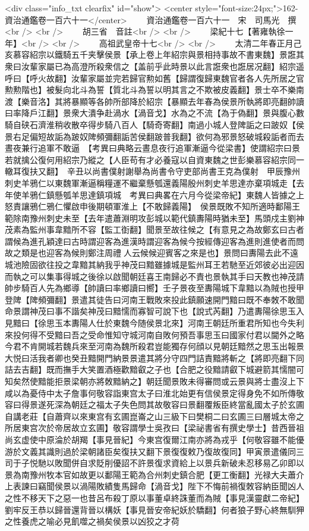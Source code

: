 <div class="info_txt clearfix" id="show">
<center style="font-size:24px;">162-資治通鑑卷一百六十一</center>
  　　資治通鑑卷一百六十一　宋　司馬光　撰<br />
<br />
　　胡三省　音註<br />
<br />
　　梁紀十七【著雍執徐一年】<br />
<br />
　　高祖武皇帝十七<br />
<br />
　　太清二年春正月己亥慕容紹宗以鐵騎五千夹擊侯景【承上卷上年紹宗與景相持事故不書東魏】景誑其衆曰汝輩家屬已為高澄所殺衆信之【盖前乎此時景以此言誑衆也誑居况翻】紹宗遥呼曰【呼火故翻】汝輩家屬並完若歸官勲如舊【歸謂復歸東魏官者各人先所居之官勲勲階也】被髮向北斗為誓【質北斗為誓以明其言之不欺被皮義翻】景士卒不樂南渡【樂音洛】其將暴顯等各帥所部降於紹宗【暴顯去年春為侯景所執將即亮翻帥讀曰率降戶江翻】景衆大潰争赴渦水【渦音戈】水為之不流【為于偽翻】景與腹心數騎自硖石濟淮稍收散卒得步騎八百人【騎奇寄翻】南過小城人登陴詬之曰跛奴【侯景右足偏短故詬為跛奴陴頻彌翻詬苦侯翻跛普我翻】欲何為邪景怒破城殺詬者而去晝夜兼行追軍不敢逼　【考異曰典略云晝息夜行追軍漸逼今從梁書】使謂紹宗曰景若就擒公復何用紹宗乃縱之【人臣苟有才必養寇以自資東魏之世彭樂慕容紹宗同一轍耳復扶又翻】　辛丑以尚書僕射謝舉為尚書令守吏部尚書王克為僕射　甲辰豫州刺史羊鴉仁以東魏軍漸逼稱糧運不繼棄懸瓠還義陽殷州刺史羊思達亦棄項城走【去年使羊鴉仁鎮懸瓠羊思達鎮項城　考異曰典畧在六月今從梁帝紀】東魏人皆據之上怒責讓鴉仁鴉仁懼啟申後期頓軍淮上【不敢歸義陽】　侯景既敗不知所適時鄱陽王範除南豫州刺史未至【去年遣蕭淵明攻彭城以範代鎮夀陽時猶未至】馬頭戍主劉神茂素為監州事韋黯所不容【監工衘翻】聞景至故往候之【有意見之為故鄭玄曰古者謂候為進孔穎達曰古時謂迎客為進漢時謂迎客為候今按經傳迎客為進則進使者而問故之類是也迎客為候則鄭注周禮人云候候迎賓客之來是也】景問曰夀陽去此不遠城池險固欲往投之韋黯其納我乎神茂曰黯雖據城是監州耳王若馳至近郊彼必出迎因而執之可以集事得城之後徐以啟聞朝廷喜王南歸必不責也景執其手曰天教也神茂請帥步騎百人先為鄉導【帥讀曰率鄉讀曰嚮】壬子景夜至夀陽城下韋黯以為賊也授甲登陴【陴頻彌翻】景遣其徒告曰河南王戰敗來投此鎮願速開門黯曰既不奉敇不敢聞命景謂神茂曰事不諧矣神茂曰黯懦而寡智可說下也【說式芮翻】乃遣夀陽徐思玉入見黯曰【徐思玉本夀陽人仕於東魏今随侯景北來】河南王朝廷所重君所知也今失利來投何得不受黯曰吾之受命惟知守城河南自敗何預吾事思玉曰國家付君以閫外之略今君不肯開城若魏兵來至河南為魏所殺君豈能獨存何顔以見朝廷黯然之思玉出報景大悦曰活我者卿也癸丑黯開門納景景遣其將分守四門詰責黯將斬之【將即亮翻下同詰去吉翻】既而撫手大笑置酒極歡黯叡之子也【合肥之役黯請叡下城避箭其懦闇可知矣然使黯能拒景梁朝亦將敇黯納之】朝廷聞景敗未得審問或云景與將士盡沒上下咸以為憂侍中太子詹事何敬容詣東宫太子曰淮北始更有信侯景定得身免不如所傳敬容曰得景遂死深為朝廷之福太子失色問其故敬容曰景翻覆叛臣終當亂國太子於玄圃自講老莊【自蕭齊以來東宫有玄圃崑崙之山三級下曰樊桐二曰玄圃三曰層城太帝之所居東宫次於帝居故立玄圃】敬容謂學士吳孜曰【梁祕書省有撰史學士】昔西晉祖尚玄虚使中原淪於胡羯【事見晉紀】今東宫復爾江南亦將為戎乎【何敬容雖不能優游於文義其識則過於梁朝諸臣矣復扶又翻下景復復敕乃復故復同】甲寅景遣儀同三司于子悦馳以敗聞併自求貶削優詔不許景復求資給上以景兵新破未忍移易乙卯即以景為南豫州牧本官如故更以鄱陽王範為合州刺史鎮合肥【更工衡翻】光禄大夫蕭介上表諫曰竊聞侯景以渦陽敗績隻馬歸命【渦音戈】陛下不悔前禍復敇容納臣聞凶人之性不移天下之惡一也昔呂布殺丁原以事董卓終誅董而為賊【事見漢靈獻二帝紀】劉牢反王恭以歸晉還背晉以構妖【事見晉安帝紀妖於驕翻】何者狼子野心終無馴狎之性養虎之喻必見飢噬之禍矣侯景以凶狡之才荷